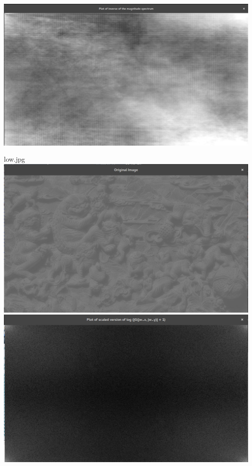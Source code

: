 \documentclass[a4paper,fleqn,11pt]{article}
\theoremstyle{mytheor}
\begin{document}
\begin{center}
\includegraphics[scale= 0.24]{../results/divyat_magnitude.png}
\end{center}
\pagebreak
\begin{center}
low.jpg \\
\includegraphics[scale= 0.29]{../results/low.png}
\includegraphics[scale= 0.29]{../results/low_spectrum.png}

\end{center}
\end{document}
